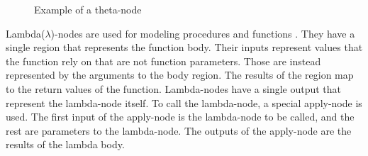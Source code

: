 \begin{figure}[H]
    \caption{Example of a theta-node \cite{Reissmann2020}}
    \label{fig:RVSDG_theta_node}
\end{figure}
\label{lbl:lambda-node}
Lambda($\lambda$)-nodes are used for modeling procedures and functions \cite{Reissmann2020}. They have a single region that represents the function body. Their inputs represent values that the function rely on that are not function parameters. Those are instead represented by the arguments to the body region. The results of the region map to the return values of the function. Lambda-nodes have a single output that represent the lambda-node itself. To call the lambda-node, a special apply-node is used. The first input of the apply-node is the lambda-node to be called, and the rest are parameters to the lambda-node. The outputs of the apply-node are the results of the lambda body.

